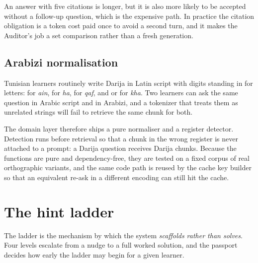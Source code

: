 \begin{note}
An answer with five citations is longer, but it is also more likely to be accepted without
a follow-up question, which is the expensive path. In practice the citation obligation is a
token cost paid once to avoid a second turn, and it makes the Auditor's job a set
comparison rather than a fresh generation.
\end{note}

\subsection{Arabizi normalisation}
\label{sec:arabizi}

Tunisian learners routinely write Darija in Latin script with digits standing in for
letters:  for \emph{ain},  for \emph{ha},  for \emph{qaf}, and
 or  for \emph{kha}. Two learners can ask the same question in Arabic
script and in Arabizi, and a tokenizer that treats them as unrelated strings will fail to
retrieve the same chunk for both.

The domain layer therefore ships a pure normaliser and a register detector. Detection runs
before retrieval so that a chunk in the wrong register is never attached to a prompt: a
Darija question receives Darija chunks. Because the functions are pure and
dependency-free, they are tested on a fixed corpus of real orthographic variants, and the
same code path is reused by the cache key builder so that an equivalent re-ask in a
different encoding can still hit the cache.

\section{The hint ladder}
\label{sec:hints}

The ladder is the mechanism by which the system \emph{scaffolds rather than solves}. Four
levels escalate from a nudge to a full worked solution, and the passport decides how early
the ladder may begin for a given learner.

